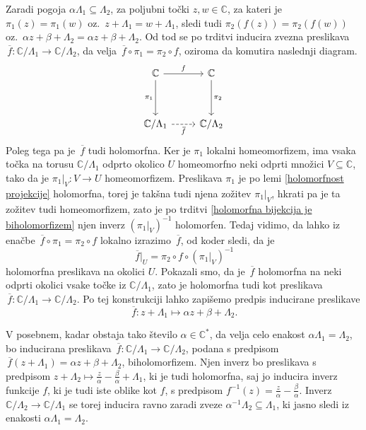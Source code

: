 \documentclass[mat1]{fmfdelo}
\numberwithin{equation}{section}
\newcommand{\C}{\mathbb C}
\newcommand{\CM}{\mathbb C ^*}
\newcommand{\inv}{^{-1}}
\newcommand{\olsi}[1]{\,\overline{\!{#1}}} %
\newcommand{\oz}{oz.\ }
\theoremstyle{definition}
\begin{document}
\begin{zgled*}
    Zaradi pogoja $\alpha\Lambda_1 \subseteq \Lambda_2$, za poljubni točki $z, w \in \C$, za kateri je $\pi_1(z) = \pi_1(w)$ \oz $z + \Lambda_1 = w + \Lambda_1$, sledi tudi $\pi_2(f(z)) = \pi_2(f(w))$ \oz $\alpha z + \beta + \Lambda_2 = \alpha z + \beta + \Lambda_2$.
    Od tod se po trditvi \cite[trditev 3.22]{MrcunTop} inducira zvezna preslikava $\olsi{f} : \C/\Lambda_1 \to \C/\Lambda_2$, da velja $\olsi{f} \circ \pi_1 = \pi_2 \circ f$, oziroma da komutira naslednji diagram.
    \[
        \begin{tikzcd}
            {\mathbb{C}} & {\mathbb{C}} \\
            \\
            {\mathbb{C}/\Lambda_1} & {\mathbb{C}/\Lambda_2}
            \arrow["f", from=1-1, to=1-2]
            \arrow["{\pi_2}", from=1-2, to=3-2]
            \arrow["{\pi_1}"', from=1-1, to=3-1]
            \arrow["{\olsi{f}}"', dashed, from=3-1, to=3-2]
        \end{tikzcd}
    \]
    Poleg tega pa je $\olsi{f}$ tudi holomorfna. Ker je $\pi_1$ lokalni homeomorfizem, ima vsaka točka na torusu $\C/\Lambda_1$ odprto okolico $U$ homeomorfno neki odprti množici $V \subseteq \C$, tako da je $\pi_1|_V : V \to U$ homeomorfizem. Preslikava $\pi_1$ je po lemi \ref{holomorfnost projekcije} holomorfna, torej je takšna tudi njena zožitev $\pi_1|_V$, hkrati pa je ta zožitev tudi homeomorfizem, zato je po trditvi \ref{holomorfna bijekcija je biholomorfizem} njen inverz $(\pi_1|_V)\inv$ holomorfen. Tedaj vidimo, da lahko iz enačbe $\olsi{f} \circ \pi_1 = \pi_2 \circ f$ lokalno izrazimo $\olsi{f}$, od koder sledi, da je 
    \[
        \olsi{f}|_U = \pi_2 \circ f \circ (\pi_1|_V)\inv
    \]
    holomorfna preslikava na okolici $U$. Pokazali smo, da je $\olsi{f}$ holomorfna na neki odprti okolici vsake točke iz $\C/\Lambda_1$, zato je holomorfna tudi kot preslikava $\olsi{f}: \C/\Lambda_1 \to \C/\Lambda_2$. Po tej konstrukciji lahko zapišemo predpis inducirane preslikave
    \[
        \olsi{f}: z + \Lambda_1 \mapsto \alpha z + \beta + \Lambda_2.  
    \]
\end{zgled*}

V posebnem, kadar obstaja tako število $\alpha \in \CM$, da velja celo enakost $\alpha\Lambda_1 = \Lambda_2$, bo inducirana preslikava $\olsi{f} : \C/\Lambda_1 \to \C/\Lambda_2$, podana s predpisom $\olsi{f}(z + \Lambda_1) = \alpha z + \beta + \Lambda_2$, biholomorfizem. Njen inverz bo preslikava s predpisom $z + \Lambda_2 \mapsto \frac{z}{\alpha} - \frac{\beta}{\alpha} + \Lambda_1$, ki je tudi holomorfna, saj jo inducira inverz funkcije $f$, ki je tudi iste oblike kot $f$, s predpisom $f\inv(z) = \frac{z}{\alpha} - \frac{\beta}{\alpha}$. Inverz $\C/\Lambda_2 \to \C/\Lambda_1$ se torej inducira ravno zaradi zveze $\alpha\inv\Lambda_2 \subseteq \Lambda_1$, ki jasno sledi iz enakosti $\alpha\Lambda_1 = \Lambda_2$.  
\end{document}
